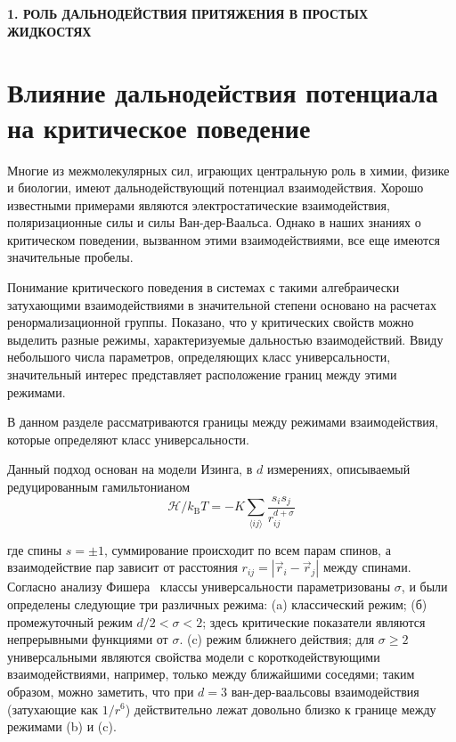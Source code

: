 
\begin{center}
\textbf{\large 1. РОЛЬ ДАЛЬНОДЕЙСТВИЯ ПРИТЯЖЕНИЯ В ПРОСТЫХ ЖИДКОСТЯХ}
\end{center}


\section{Влияние дальнодействия потенциала на критическое поведение}

Многие из межмолекулярных сил, играющих центральную роль в химии, физике и биологии, имеют дальнодействующий потенциал взаимодействия.
Хорошо известными примерами являются электростатические взаимодействия, поляризационные силы и силы Ван-дер-Ваальса.
Однако в наших знаниях о критическом поведении, вызванном этими взаимодействиями, все еще имеются значительные пробелы.

Понимание критического поведения в системах с такими алгебраически затухающими взаимодействиями в значительной степени основано на расчетах ренормализационной группы.
Показано, что у критических свойств можно выделить разные режимы, характеризуемые дальностью взаимодействий.
Ввиду небольшого числа параметров, определяющих класс универсальности, значительный интерес представляет расположение границ между этими режимами.

В данном разделе рассматриваются границы между режимами взаимодействия, которые определяют класс универсальности. 

Данный подход основан на модели Изинга, в $d$ измерениях, описываемый редуцированным гамильтонианом
\begin{equation}
\mathcal{H} / k_{\mathrm{B}} T=-K \sum_{\langle i j\rangle} \frac{s_{i} s_{j}}{r_{i j}^{d+\sigma}}
\label{eq1}
\end{equation}

где спины $s=\pm 1$, суммирование происходит по всем парам спинов, а взаимодействие пар зависит от расстояния $r_{i j}=\left|\vec {r}_{i}-\vec{r}_{j}\right|$ между спинами. Согласно анализу Фишера~\cite{10.1103/PhysRevLett.29.917} классы универсальности параметризованы $\sigma$, и были определены следующие три различных режима: (a) классический режим; (б) промежуточный режим $d/2<\sigma<2$; здесь критические показатели являются непрерывными функциями от $\sigma$. (c) режим ближнего действия; для $\sigma\geq 2$ универсальными являются свойства модели с короткодействующими взаимодействиями, например, только между ближайшими соседями; таким образом, можно заметить, что при $d=3$ ван-дер-ваальсовы взаимодействия (затухающие как $1/r^{6}$) действительно лежат довольно близко к границе между режимами (b) и (c).

